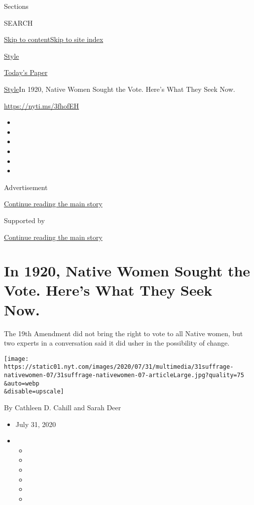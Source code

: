 Sections

SEARCH

\protect\hyperlink{site-content}{Skip to
content}\protect\hyperlink{site-index}{Skip to site index}

\href{https://www.nytimes.com/section/style}{Style}

\href{https://myaccount.nytimes.com/auth/login?response_type=cookie\&client_id=vi}{}

\href{https://www.nytimes.com/section/todayspaper}{Today's Paper}

\href{/section/style}{Style}\textbar{}In 1920, Native Women Sought the
Vote. Here's What They Seek Now.

\url{https://nyti.ms/3fhofEH}

\begin{itemize}
\item
\item
\item
\item
\item
\item
\end{itemize}

Advertisement

\protect\hyperlink{after-top}{Continue reading the main story}

Supported by

\protect\hyperlink{after-sponsor}{Continue reading the main story}

\hypertarget{in-1920-native-women-sought-the-vote-heres-what-they-seek-now}{%
\section{In 1920, Native Women Sought the Vote. Here's What They Seek
Now.}\label{in-1920-native-women-sought-the-vote-heres-what-they-seek-now}}

The 19th Amendment did not bring the right to vote to all Native women,
but two experts in a conversation said it did usher in the possibility
of change.

\texttt{[image: https://static01.nyt.com/images/2020/07/31/multimedia/31suffrage-nativewomen-07/31suffrage-nativewomen-07-articleLarge.jpg?quality=75\\\&auto=webp\\\&disable=upscale]}

By Cathleen D. Cahill and Sarah Deer

\begin{itemize}
\item
  July 31, 2020
\item
  \begin{itemize}
  \item
  \item
  \item
  \item
  \item
  \item
  \end{itemize}
\end{itemize}

